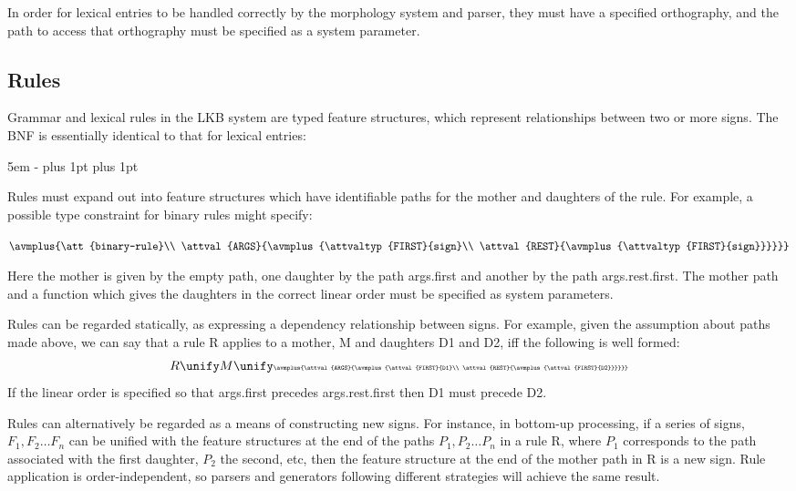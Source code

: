 \documentclass[12pt]{report}
\begin{document}
In order for lexical entries to be handled correctly by
the morphology system and parser, they must have a specified
orthography, and the path to access that orthography
must be specified as a system parameter.

\subsection{Rules}
\label{rules}
Grammar and lexical rules in the LKB 
system are typed feature structures,
which represent relationships between two or more signs.
The BNF is essentially identical to that for
lexical entries:
\begin{list}{}
   {\leftmargin 5em
    \itemindent -\leftmargin
    \itemsep 0pt plus 1pt
    \parsep 0pt plus 1pt}
\end{list}

Rules must expand out into feature structures which have identifiable paths
for the mother and daughters of the rule.  For example,
a possible type constraint for binary rules might specify:
\begin{center}
{\tiny
   $\avmplus{\att{binary-rule}\\
             \attval{ARGS}{\avmplus{\attvaltyp{FIRST}{sign}\\
                                    \attval{REST}{\avmplus{\attvaltyp{FIRST}{sign}}}}}}$}
\end{center}
Here the mother is given by the empty path, one daughter 
by the path {\feature args}.{\feature first} and another by the path
{\feature args}.{\feature rest}.{\feature first}.  
The mother path and a function which gives the
daughters in the correct linear order must be specified as system parameters.

Rules can be regarded statically,
as expressing a dependency relationship between signs.
For example, given the assumption about paths made above, 
we can say that a rule R applies to a mother, M and daughters D1 and D2,
iff the following is well
formed:
\[
R \unify M \unify
\mbox{\tiny
   $\avmplus{\attval{ARGS}{\avmplus{\attval{FIRST}{D1}\\
                                    \attval{REST}{\avmplus{\attval{FIRST}{D2}}}}}}$}
\] 
If the linear order is specified so that {\feature args.first} precedes
{\feature args.rest.first} then D1 must precede D2.


Rules can alternatively be regarded as a means of constructing
new signs.  For
instance, in bottom-up processing,
if a series of signs, $F_{1}, F_{2} \ldots F_n$ can be unified 
with the feature structures at the end of the paths $P_{1}, P_{2} \ldots P_{n}$
in a rule R, where $P_{1}$ corresponds to the path associated with the
first daughter, $P_{2}$ the second, etc,
then the feature structure at the end of
the mother path in R is a new sign.  
Rule application is order-independent, so parsers and generators 
following different 
strategies will achieve the same result.  
\end{document}
